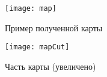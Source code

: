 \begin{figure}[h]
	\centering   
	\texttt{[image: map]} 
	\caption{Пример полученной карты}
	\label{fig:map}
\end{figure}

\begin{figure}[h]
	\centering   
	\texttt{[image: mapCut]} 
	\caption{Часть карты (увеличено)}
	\label{fig:mapCut}
\end{figure}